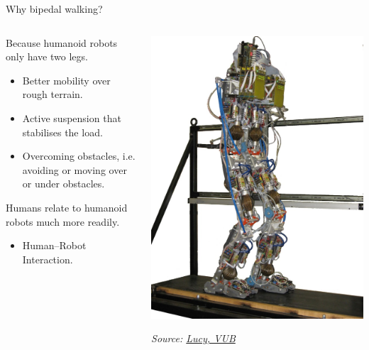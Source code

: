 \documentclass[compress]{beamer}
\newcommand{\source}[2]{{\tiny\it Source: \href{#1}{#2}}}
\begin{document}
\begin{frame}{Why bipedal walking?}
    \begin{columns}
        \begin{column}{0.5\linewidth}

    Because humanoid robots only have two legs.

    \begin{itemize}

        \item Better mobility over rough terrain.
        \item Active suspension that stabilises the load.
        \item Overcoming obstacles, i.e. avoiding or moving over or under obstacles.
    \end{itemize}

    Humans relate to humanoid robots much more readily.

    \begin{itemize}

        \item Human--Robot Interaction.
    \end{itemize}
            
        \end{column}
        \begin{column}{0.5\linewidth}
            \begin{center}
                \includegraphics[width=0.8\linewidth]{lucy}

    \source{http://lucy.vub.ac.be/}{Lucy, VUB}
            \end{center}
        \end{column}
    \end{columns}

\end{frame}
\end{document}
